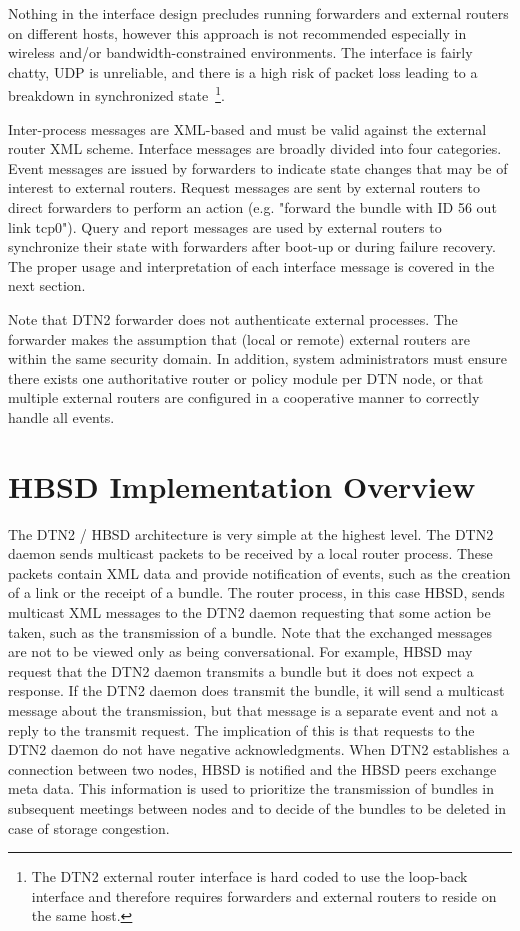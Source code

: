 Nothing in the interface design precludes running forwarders and external routers on different hosts, however this approach is not recommended especially in wireless and/or bandwidth-constrained environments. The interface is fairly chatty, UDP is unreliable, and there is a high risk of packet loss leading to a breakdown in synchronized state~\footnote{The DTN2 external router interface is hard coded to use the loop-back interface and therefore requires forwarders and external routers to reside on the same host.}.

Inter-process messages are XML-based and must be valid against the external router XML scheme. Interface messages are broadly divided into four categories. Event messages are issued by forwarders to indicate state changes that may be of interest to external routers. Request messages are sent by external routers to direct forwarders to perform an action (e.g. "forward the bundle with ID 56 out link tcp0"). Query and report messages are used by external routers to synchronize their state with forwarders after boot-up or during failure recovery. The proper usage and interpretation of each interface message is covered in the next section.

Note that DTN2 forwarder does not authenticate external processes. The forwarder makes the assumption that (local or remote) external routers are within the same security domain. In addition, system administrators must ensure there exists one authoritative router or policy module per DTN node, or that multiple external routers are configured in a cooperative manner to correctly handle all events.


\section{HBSD Implementation Overview}

The DTN2 / HBSD architecture is very simple at the highest level. The DTN2 daemon sends multicast packets to be received by a local router process. These packets contain XML data and provide notification of events, such as the creation of a link or the receipt of a bundle.
The router process, in this case HBSD, sends multicast XML messages to the DTN2 daemon requesting that some action be taken, such as the transmission of a bundle. Note that the exchanged messages are not to be viewed only as being conversational. For example, HBSD may request that the DTN2 daemon transmits a bundle but it does not expect a response. If the DTN2 daemon does transmit the bundle, it will send a multicast message about the transmission, but that message is a separate event and not a reply to the transmit request. The implication of this is that requests to the DTN2 daemon do not have negative acknowledgments. When DTN2 establishes a connection between two nodes, HBSD is notified and the HBSD peers exchange meta data. This information is used to prioritize the transmission of bundles in subsequent meetings between nodes and to decide of the bundles to be deleted in case of storage congestion. 

